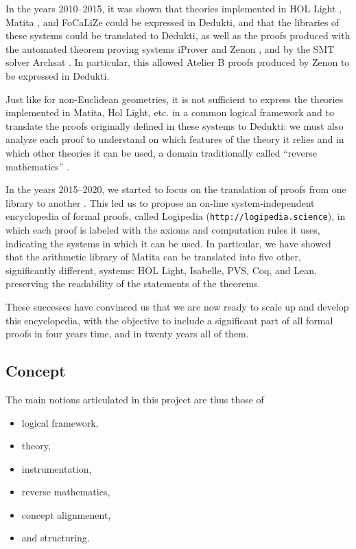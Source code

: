 In the years 2010--2015, it was shown that theories implemented in {\sc
HOL Light} \cite{Assaf12}, {\sc Matita} \cite{Assaf15}, and {\sc
FoCaLiZe} \cite{Cauderlier16} could be expressed in {\sc Dedukti}, and
that the libraries of these systems could be translated to {\sc
Dedukti}, as well as the proofs produced with the automated theorem
proving systems {\sc iProver} \cite{Burel10} and {\sc Zenon}
\cite{CauderlierHalmagrand15}, and by the SMT solver {\sc Archsat}
\cite{Bury19}. In particular, this allowed {\sc Atelier B} proofs
produced by {\sc Zenon} to be expressed in {\sc Dedukti}.

Just like for non-Euclidean geometries, it is not
sufficient to express the theories implemented in {\sc Matita}, {\sc
Hol Light}, etc.  in a common logical framework and to translate the
proofs originally defined in these systems to {\sc Dedukti}: we must
also analyze each proof to understand on which features of the theory
it relies and in which other theories it can be used, a domain traditionally called
``reverse mathematics'' \cite{Friedman76,Simpson09,Dowek17}.


In the years 2015--2020, we started to focus on the translation of
proofs from one library to another \cite{Dowek17,Thire18}. This led us
to propose an on-line system-independent encyclopedia of formal
proofs, called {\sc Logipedia} ({\tt http://logipedia.science}), in
which each proof is labeled with the axioms and computation rules it
uses, indicating the systems in which it can be used. In particular,
we have showed that the arithmetic library of {\sc Matita} can be
translated into five other, significantly different, systems: {\sc HOL
  Light}, {\sc Isabelle}, {\sc PVS}, {\sc Coq}, and {\sc Lean},
preserving the readability of the statements of the theorems.

These successes have convinced us that we are now ready to scale up
and develop this encyclopedia, with the objective to include a
significant part of all formal proofs in four years time, and
in twenty years all of them.

\subsection{Concept}

The main notions articulated in this project are thus those of
\begin{itemize}
\item logical framework,
\item theory,
\item instrumentation,
\item reverse mathematics,
\item concept alignmenent,
\item and structuring.
\end{itemize}

